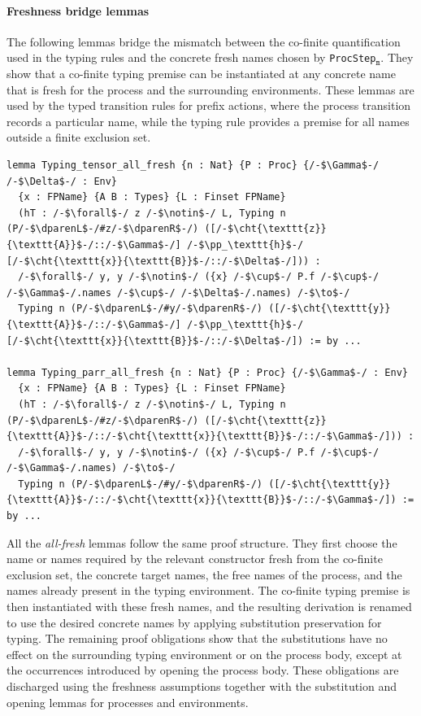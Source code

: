 \paragraph{Freshness bridge lemmas}
The following lemmas bridge the mismatch between the co-finite quantification used in the typing rules and the concrete fresh names chosen by \texttt{ProcStep}$_{\texttt{m}}$. They show that a co-finite typing premise can be instantiated at any concrete name that is fresh for the process and the surrounding environments. These lemmas are used by the typed transition rules for prefix actions, where the process transition records a particular name, while the typing rule provides a premise for all names outside a finite exclusion set.

\begin{lstlisting}[language=Lean4,
  caption={Freshness bridge lemmas for instantiating the co-finite premises of the \texttt{tensor} and \texttt{parr} typing rules.},
  label={lst:app-all-fresh}]
lemma Typing_tensor_all_fresh {n : Nat} {P : Proc} {/-$\Gamma$-/ /-$\Delta$-/ : Env}
  {x : FPName} {A B : Types} {L : Finset FPName}
  (hT : /-$\forall$-/ z /-$\notin$-/ L, Typing n (P/-$\dparenL$-/#z/-$\dparenR$-/) ([/-$\cht{\texttt{z}}{\texttt{A}}$-/::/-$\Gamma$-/] /-$\pp_\texttt{h}$-/ [/-$\cht{\texttt{x}}{\texttt{B}}$-/::/-$\Delta$-/])) :
  /-$\forall$-/ y, y /-$\notin$-/ ({x} /-$\cup$-/ P.f /-$\cup$-/ /-$\Gamma$-/.names /-$\cup$-/ /-$\Delta$-/.names) /-$\to$-/
  Typing n (P/-$\dparenL$-/#y/-$\dparenR$-/) ([/-$\cht{\texttt{y}}{\texttt{A}}$-/::/-$\Gamma$-/] /-$\pp_\texttt{h}$-/ [/-$\cht{\texttt{x}}{\texttt{B}}$-/::/-$\Delta$-/]) := by ...

lemma Typing_parr_all_fresh {n : Nat} {P : Proc} {/-$\Gamma$-/ : Env}
  {x : FPName} {A B : Types} {L : Finset FPName}
  (hT : /-$\forall$-/ z /-$\notin$-/ L, Typing n (P/-$\dparenL$-/#z/-$\dparenR$-/) ([/-$\cht{\texttt{z}}{\texttt{A}}$-/::/-$\cht{\texttt{x}}{\texttt{B}}$-/::/-$\Gamma$-/])) :
  /-$\forall$-/ y, y /-$\notin$-/ ({x} /-$\cup$-/ P.f /-$\cup$-/ /-$\Gamma$-/.names) /-$\to$-/
  Typing n (P/-$\dparenL$-/#y/-$\dparenR$-/) ([/-$\cht{\texttt{y}}{\texttt{A}}$-/::/-$\cht{\texttt{x}}{\texttt{B}}$-/::/-$\Gamma$-/]) := by ...
\end{lstlisting}

All the \emph{all-fresh} lemmas follow the same proof structure. They first choose the name or names required by the relevant constructor fresh from the co-finite exclusion set, the concrete target names, the free names of the process, and the names already present in the typing environment. The co-finite typing premise is then instantiated with these fresh names, and the resulting derivation is renamed to use the desired concrete names by applying substitution preservation for typing. The remaining proof obligations show that the substitutions have no effect on the surrounding typing environment or on the process body, except at the occurrences introduced by opening the process body. These obligations are discharged using the freshness assumptions together with the substitution and opening lemmas for processes and environments.

